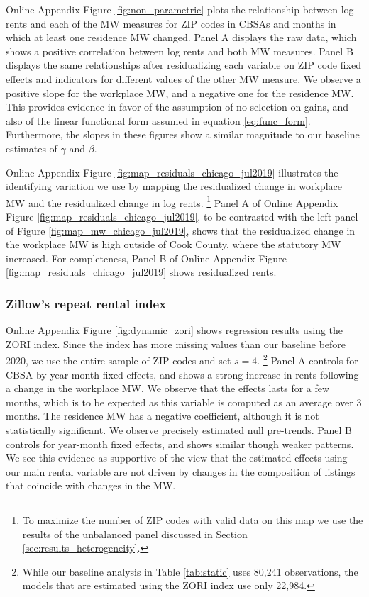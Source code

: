 Online Appendix Figure \ref{fig:non_parametric} plots the relationship between 
log rents and each of the MW measures for ZIP codes in CBSAs and months 
in which at least one residence MW changed.
Panel A displays the raw data, which shows a positive correlation between log 
rents and both MW measures.
Panel B displays the same relationships after residualizing each variable on 
ZIP code fixed effects and indicators for different values of the other MW 
measure.
We observe a positive slope for the workplace MW, and a negative one for
the residence MW.
This provides evidence in favor of the assumption of no selection on gains, and
also of the linear functional form assumed in equation \eqref{eq:func_form}. 
Furthermore, the slopes in these figures show a similar magnitude to our 
baseline estimates of $\gamma$ and $\beta$.

Online Appendix Figure \ref{fig:map_residuals_chicago_jul2019} illustrates the 
identifying variation we use by mapping the residualized change in workplace MW 
and the residualized change in log rents.%
\footnote{To maximize the number of ZIP codes with valid data on this map we
    use the results of the unbalanced panel discussed in Section 
    \ref{sec:results_heterogeneity}.}
Panel A of Online Appendix Figure \ref{fig:map_residuals_chicago_jul2019}, to be 
contrasted with the left panel of Figure \ref{fig:map_mw_chicago_jul2019}, 
shows that the residualized change in the workplace MW is high outside of Cook 
County, where the statutory MW increased.
For completeness, Panel B of Online Appendix Figure 
\ref{fig:map_residuals_chicago_jul2019} shows residualized rents.

\subsubsection{Zillow's repeat rental index}

Online Appendix Figure \ref{fig:dynamic_zori} shows regression results
using the ZORI index.
Since the index has more missing values than our baseline before 2020,
we use the entire sample of ZIP codes and set $s=4$.%
\footnote{While our baseline analysis in Table \ref{tab:static} uses 80,241 
    observations, the models that are estimated using the ZORI index use 
    only 22,984.}
Panel A controls for CBSA by year-month fixed effects, and shows 
a strong increase in rents following a change in the workplace MW.
We observe that the effects lasts for a few months, which is to be expected
as this variable is computed as an average over 3 months.
The residence MW has a negative coefficient, although it is not statistically 
significant.
We observe precisely estimated null pre-trends.
Panel B controls for year-month fixed effects, and shows similar though 
weaker patterns.
We see this evidence as supportive of the view that the estimated effects
using our main rental variable are not driven by changes in the composition
of listings that coincide with changes in the MW.


